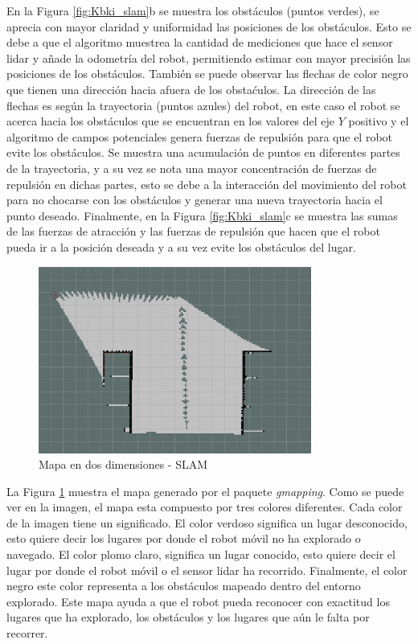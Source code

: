 En la Figura \ref{fig:Kbki_slam}b se muestra los obstáculos (puntos verdes), se 
aprecia con mayor claridad y uniformidad las posiciones de los obstáculos. Esto se debe 
a que el algoritmo muestrea la cantidad de mediciones que hace el sensor lidar y añade 
la odometría del robot, permitiendo estimar con mayor precisión las posiciones de los 
obstáculos. También se puede observar las flechas de color negro que tienen una dirección 
hacia afuera de los obstaćulos. La dirección de las flechas es según la trayectoria 
(puntos azules) del robot, en este caso el robot se acerca hacia los obstáculos que se 
encuentran en los valores del eje $Y$ positivo y el algoritmo de campos potenciales 
genera fuerzas de repulsión para que el robot evite los obstáculos. Se muestra una 
acumulación de puntos en diferentes partes de la trayectoria, y a su vez se nota una 
mayor concentración de fuerzas de repulsión en dichas partes, esto se debe a la interacción 
del movimiento del robot para no chocarse con los obstáculos y generar una nueva trayectoria 
hacia el punto deseado. Finalmente, en la Figura \ref{fig:Kbki_slam}c se muestra las sumas 
de las fuerzas de atracción y las fuerzas de repulsión que hacen que el robot pueda ir a la 
posición deseada y a su vez evite los obstáculos del lugar.

\begin{figure}
  \centering \footnotesize
  \includegraphics[width=0.80\textwidth]{images/map_slam.png}
  \captionsetup{font=footnotesize}
  \caption{Mapa en dos dimensiones - SLAM}
  \label{fig:SLAM_2D}
\end{figure}

La Figura \ref{fig:SLAM_2D} muestra el mapa generado por el paquete \textit{gmapping}. Como 
se puede ver en la imagen, el mapa esta compuesto por tres colores diferentes. Cada color 
de la imagen tiene un significado. El color verdoso significa un lugar desconocido, esto 
quiere decir los lugares por donde el robot móvil no ha explorado o navegado. El color 
plomo claro, significa un lugar conocido, esto quiere decir el lugar por donde el robot 
móvil o el sensor lidar ha recorrido. Finalmente, el color negro este color representa a 
los obstáculos mapeado dentro del entorno explorado. Este mapa ayuda a que el robot pueda 
reconocer con exactitud los lugares que ha explorado, los obstáculos y los lugares que aún 
le falta por recorrer.

